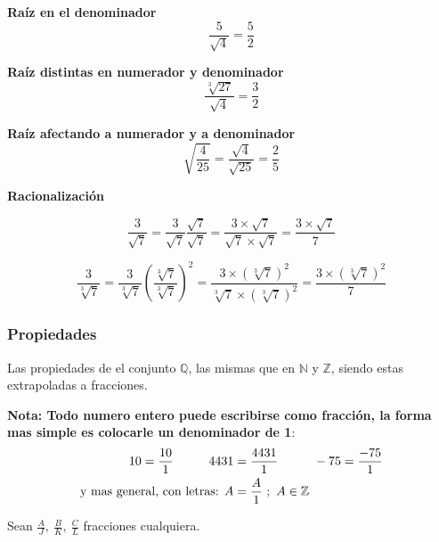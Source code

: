 \documentclass[12pt]{article}
\begin{document}
    \textbf{Raíz en el denominador}
    $$\frac{5}{\sqrt{4}} = \frac{5}{2} $$

    \textbf{Raíz distintas en numerador y denominador}
    $$\frac{\sqrt[3]{27}}{\sqrt{4}}  = \frac{3}{2} $$

    \textbf{Raíz afectando a numerador y a denominador}
    $$ \sqrt{\frac{4}{25}} =  \frac{\sqrt{4}}{\sqrt{25}} = \frac{2}{5} $$

    \textbf{Racionalización}

    $$\frac{3}{\sqrt{7}} =\frac{3}{\sqrt{7}} \frac{\sqrt{7}}{\sqrt{7}}
    = \frac{3\times \sqrt{7}}{\sqrt{7}\times\sqrt{7}} = \frac{3\times \sqrt{7}}{7}   $$


    $$\frac{3}{\sqrt[3]{7}} =\frac{3}{\sqrt[3]{7}} \left(\frac{\sqrt[3]{7}}{\sqrt[3]{7}}\right)^2
    = \frac{3\times (\sqrt[3]{7})^2 }{\sqrt[3]{7}\times(\sqrt[3]{7})^2} = \frac{3\times (\sqrt[3]{7})^2}{7}   $$


\subsubsection*{Propiedades}
    Las propiedades de el conjunto $\mathbb{Q}$, las mismas que en $\mathbb{N}$
    y $\mathbb{Z}$, siendo estas extrapoladas a fracciones.

    \textbf{Nota: Todo numero entero puede escribirse como fracción, la forma mas
    simple es colocarle un denominador de 1}:
    \begin{align*}
        10=\frac{10}{1} \hspace*{1cm}	4431 &= \frac{4431}{1}\hspace*{1cm}	-75=\frac{-75}{1} \\
        \text{y mas general, con letras:  } A &= \frac{A}{1}\ ;\ A\in \mathbb{Z}
    \end{align*}


    Sean $\displaystyle \frac{A}{J},\ \frac{B}{K},\ \frac{C}{L}$ fracciones cualquiera.
\end{document}
